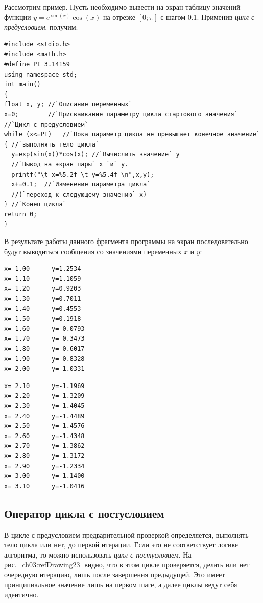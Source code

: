 Рассмотрим пример. Пусть необходимо вывести на экран таблицу значений функции  $y=e^{\sin (x)}\cos (x)$ на отрезке 
$[0;\pi]$ с шагом 0.1. Применив \emph{цикл с предусловием}, получим:
\begin{lstlisting}
#include <stdio.h>
#include <math.h>
#define PI 3.14159
using namespace std;
int main()
{
float x, y; //`Описание переменных`
x=0;        //`Присваивание параметру цикла стартового значения`
//`Цикл с предусловием`
while (x<=PI)	//`Пока параметр цикла не превышает конечное значение`
{ //`выполнять тело цикла`
  y=exp(sin(x))*cos(x); //`Вычислить значение` y
  //`Вывод на экран пары` x `и` y.
  printf("\t x=%5.2f \t y=%5.4f \n",x,y);
  x+=0.1;  //`Изменение параметра цикла` 
  //(`переход к следующему значению` x)
} //`Конец цикла`
return 0;
}
\end{lstlisting}

В результате работы данного фрагмента программы на экран последовательно будут выводиться сообщения со значениями
переменных $x$ и $y$\label{ch03:out0}:%

\smallskip
\noindent%
\begin{minipage}{.3\textwidth}
\begin{verbatim}
x= 1.00      y=1.2534 
x= 1.10      y=1.1059 
x= 1.20      y=0.9203 
x= 1.30      y=0.7011 
x= 1.40      y=0.4553 
x= 1.50      y=0.1918 
x= 1.60      y=-0.0793 
x= 1.70      y=-0.3473 
x= 1.80      y=-0.6017 
x= 1.90      y=-0.8328 
x= 2.00      y=-1.0331
\end{verbatim}
\end{minipage}
\begin{minipage}{.3\textwidth}
\begin{verbatim}
x= 2.10      y=-1.1969 
x= 2.20      y=-1.3209 
x= 2.30      y=-1.4045 
x= 2.40      y=-1.4489 
x= 2.50      y=-1.4576 
x= 2.60      y=-1.4348 
x= 2.70      y=-1.3862 
x= 2.80      y=-1.3172 
x= 2.90      y=-1.2334 
x= 3.00      y=-1.1400 
x= 3.10      y=-1.0416 
\end{verbatim}
\end{minipage}
\hfill

\subsection[Оператор цикла с постусловием]{Оператор цикла с постусловием}
В цикле с предусловием предварительной проверкой определяется, выполнять тело цикла или нет, до первой итерации. Если
это не соответствует логике алгоритма, то можно использовать 
\emph{цикл с постусловием}. На рис.~\ref{ch03:refDrawing23}
видно, что в этом цикле проверяется, делать или нет очередную итерацию, лишь после завершения предыдущей. Это имеет
принципиальное значение лишь на первом шаге, а далее циклы ведут себя идентично. 


